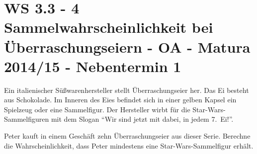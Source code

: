\section{WS 3.3 - 4 Sammelwahrscheinlichkeit bei Überraschungseiern - OA - Matura 2014/15 - Nebentermin 1}

\begin{beispiel}[WS 3.3]{1}
Ein italienischer Süßwarenhersteller stellt Überraschungseier her. Das Ei besteht aus Schokolade. Im Inneren des Eies befindet sich in einer gelben Kapsel ein Spielzeug oder eine Sammelfigur. Der Hersteller wirbt für die Star-Wars-Sammelfiguren mit dem Slogan "`Wir sind jetzt mit dabei, in
jedem 7. Ei!"'. 

Peter kauft in einem Geschäft zehn Überraschungseier aus dieser Serie. Berechne die Wahrscheinlichkeit, dass Peter mindestens eine Star-Wars-Sammelfigur erhält. 

\end{beispiel}